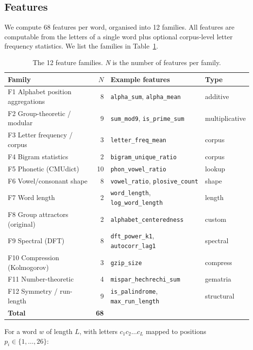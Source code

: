 \documentclass{article}
\begin{document}
\subsection{Features}

We compute 68 features per word, organised into 12 families. All features are computable from the letters of a single word plus optional corpus-level letter frequency statistics. We list the families in Table~\ref{tab:features}.

\begin{table}[ht]
\centering
\caption{The 12 feature families. \emph{N} is the number of features per family.}
\label{tab:features}
\small
\begin{tabular}{lrll}
\toprule
Family & $N$ & Example features & Type \\
\midrule
F1 Alphabet position aggregations & 8 & \texttt{alpha\_sum}, \texttt{alpha\_mean} & additive \\
F2 Group-theoretic / modular & 9 & \texttt{sum\_mod9}, \texttt{is\_prime\_sum} & multiplicative \\
F3 Letter frequency / corpus & 3 & \texttt{letter\_freq\_mean} & corpus \\
F4 Bigram statistics & 2 & \texttt{bigram\_unique\_ratio} & corpus \\
F5 Phonetic (CMUdict) & 10 & \texttt{phon\_vowel\_ratio} & lookup \\
F6 Vowel/consonant shape & 8 & \texttt{vowel\_ratio}, \texttt{plosive\_count} & shape \\
F7 Word length & 2 & \texttt{word\_length}, \texttt{log\_word\_length} & length \\
F8 Group attractors (original) & 2 & \texttt{alphabet\_centeredness} & custom \\
F9 Spectral (DFT) & 8 & \texttt{dft\_power\_k1}, \texttt{autocorr\_lag1} & spectral \\
F10 Compression (Kolmogorov) & 3 & \texttt{gzip\_size} & compress \\
F11 Number-theoretic & 4 & \texttt{mispar\_hechrechi\_sum} & gematria \\
F12 Symmetry / run-length & 9 & \texttt{is\_palindrome}, \texttt{max\_run\_length} & structural \\
\midrule
\textbf{Total} & \textbf{68} & & \\
\bottomrule
\end{tabular}
\end{table}

For a word $w$ of length $L$, with letters $c_1 c_2 \ldots c_L$ mapped to positions $p_i \in \{1, \ldots, 26\}$:
\end{document}
